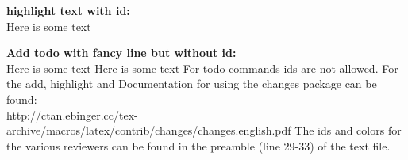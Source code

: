 \documentclass[11pt, showtrims, final, oldfontcommands]{memoir}
\begin{document}
\textbf{highlight text with id:}\\
Here is some text

\textbf{Add todo with fancy line but without id:}\\
Here is some text 
 Here is some text
\newline 
\newline
\newline
\newline 
\newline
\newline
For todo commands ids are not allowed. For the add, highlight and
Documentation for using the changes package can be found:\\
http://ctan.ebinger.cc/tex-archive/macros/latex/contrib/changes/changes.english.pdf
\newline
The ids and colors for the various reviewers can be found in the preamble (line 29-33) of the text file.





\cleardoublepage

\setupparasubsecs
\setupmaintoc
\tableofcontents
\setlength{\unitlength}{1pt}
\cleardoublepage




\mainmatter








\backmatter

%



\listoftodos
\end{document}
